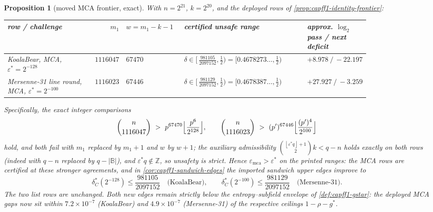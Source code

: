 \documentclass[11pt]{article}
\newtheorem{proposition}[proposition]{Proposition}
\theoremstyle{definition}
\theoremstyle{remark}
\newcommand{\B}{\mathbb{B}}
\newcommand{\emca}{\varepsilon_{\mathrm{mca}}}
\providecommand{\floor}[1]{\left\lfloor #1\right\rfloor}
\begin{document}
\begin{proposition}[moved MCA frontier, exact]\label{prop:capg-moved-frontier}
With $n=2^{21}$, $k=2^{20}$, and the deployed rows of
\cref{prop:capff1-identity-frontier}:
\begin{center}\footnotesize
\setlength{\tabcolsep}{3pt}
\begin{tabular}{@{}p{0.23\linewidth}rp{0.16\linewidth}p{0.34\linewidth}p{0.12\linewidth}@{}}
\toprule
row / challenge & $m_1$ & $w=m_1-k-1$ & certified unsafe range &
approx. $\log_2$ pass / next deficit \\
\midrule
KoalaBear, MCA, $\varepsilon^{*}=2^{-128}$ & $1116047$ & $67470$ &
$\delta\in[\,\tfrac{981105}{2097152},\tfrac12)=[0.4678273\ldots,\tfrac12)$
& $+8.978\ /\ -22.197$ \\
Mersenne-31 line round, MCA, $\varepsilon^{*}=2^{-100}$ & $1116023$ &
$67446$ &
$\delta\in[\,\tfrac{981129}{2097152},\tfrac12)=[0.4678387\ldots,\tfrac12)$
& $+27.927\ /\ -3.259$ \\
\bottomrule
\end{tabular}
\end{center}
Specifically, the exact integer comparisons
\[
        \binom{n}{1116047}\ >\ p^{67470}\Bigl\lfloor\frac{p^{6}}{2^{128}}\Bigr\rfloor,
        \qquad
        \binom{n}{1116023}\ >\ (p')^{67446}\Bigl\lfloor\frac{(p')^{4}}{2^{100}}\Bigr\rfloor
\]
hold, and both fail with $m_1$ replaced by $m_1+1$ and $w$ by $w+1$; the
auxiliary admissibility
$\binom{\floor{\varepsilon^{*}q}+1}{2}k<q-n$ holds exactly on both rows
(indeed with $q-n$ replaced by $q-|\B|$), and
$\varepsilon^{*}q\notin\mathbb Z$, so unsafety is strict.  Hence
$\emca>\varepsilon^{*}$ on the printed ranges: the MCA rows are certified at these stronger agreements, and in \cref{cor:capff1-sandwich-edges} the imported sandwich
upper edges improve to
\[
        \delta^{*}_{C}(2^{-128})\le\frac{981105}{2097152}
        \quad\text{(KoalaBear)},\qquad
        \delta^{*}_{C}(2^{-100})\le\frac{981129}{2097152}
        \quad\text{(Mersenne-31)}.
\]
The two list rows are unchanged.  Both new edges remain strictly below the
entropy--subfield envelope of \cref{def:capff1-gstar}: the deployed MCA
gaps now sit within $7.2\times10^{-7}$ (KoalaBear) and
$4.9\times10^{-7}$ (Mersenne-31) of the respective ceilings
$1-\rho-g^{*}$.
\end{proposition}
\end{document}
